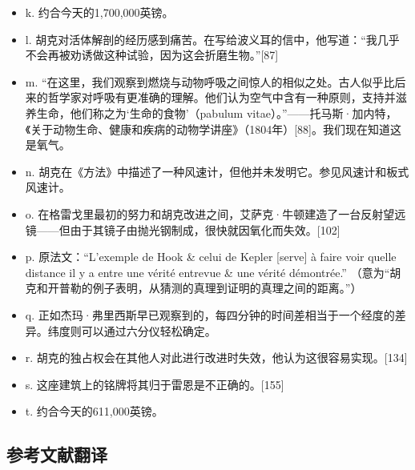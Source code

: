 \begin{itemize}
\item k. 约合今天的1,700,000英镑。
\item l. 胡克对活体解剖的经历感到痛苦。在写给波义耳的信中，他写道：“我几乎不会再被劝诱做这种试验，因为这会折磨生物。”[87]
\item m. “在这里，我们观察到燃烧与动物呼吸之间惊人的相似之处。古人似乎比后来的哲学家对呼吸有更准确的理解。他们认为空气中含有一种原则，支持并滋养生命，他们称之为‘生命的食物’（pabulum vitae）。”——托马斯·加内特，《关于动物生命、健康和疾病的动物学讲座》（1804年）[88]。我们现在知道这是氧气。
\item n. 胡克在《方法》中描述了一种风速计，但他并未发明它。参见风速计和板式风速计。
\item o. 在格雷戈里最初的努力和胡克改进之间，艾萨克·牛顿建造了一台反射望远镜——但由于其镜子由抛光钢制成，很快就因氧化而失效。[102]
\item p. 原法文：“L'exemple de Hook & celui de Kepler [serve] à faire voir quelle distance il y a entre une vérité entrevue & une vérité démontrée.” （意为“胡克和开普勒的例子表明，从猜测的真理到证明的真理之间的距离。”）
\item q. 正如杰玛·弗里西斯早已观察到的，每四分钟的时间差相当于一个经度的差异。纬度则可以通过六分仪轻松确定。
\item r. 胡克的独占权会在其他人对此进行改进时失效，他认为这很容易实现。[134]
\item s. 这座建筑上的铭牌将其归于雷恩是不正确的。[155]
\item t. 约合今天的611,000英镑。
\end{itemize}
\subsection{参考文献翻译}
